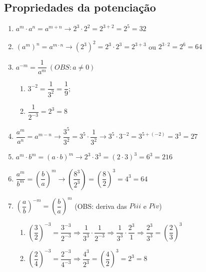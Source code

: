 \subsection{Propriedades da potenciação}
\begin{enumerate}[label=P\roman*)]
	\item $ a^{m} \cdot a^{n} = a^{m+n} \longrightarrow 2^{3} \cdot 2^{2} = 2^{3+2} = 2^{5} = 32 $
	\item $ (a^{m})^{n} = a^{m\cdot n} \longrightarrow (2^{3})^{2} = 2^{3}\cdot 2^{3} = 2^{3+3} $ ou $ 2^{3\cdot 2} = 2^{6} = 64 $
	\item $ a^{-m} = \dfrac{1}{a^{m}}\ (OBS: a \neq 0)$
	\begin{enumerate}[label=\alph*)]
		\item $ 3^{-2} = \dfrac{1}{3^{2}} = \dfrac{1}{9}; $
		
		\item $\dfrac{1}{2^{-3}} = 2^{3} = 8 $ 
	\end{enumerate}
	\item $ \dfrac{a^{m}}{a^{n}} = a^{m-n} \longrightarrow \dfrac{3^{5}}{3^{2}} = 3^{5}\cdot \dfrac{1}{3^{2}} \longrightarrow 3^{5}\cdot 3^{-2} = 3^{5+(-2)} = 3^{3} = 27$
	\item $ a^{m}\cdot b^{m}= (a\cdot b)^{m} \longrightarrow 2^{3}\cdot 3^{3} = (2\cdot 3)^{3} = 6^{3} = 216 $
	\item $ \dfrac{a^{m}}{b^{m}} = (\dfrac{b}{a})^{m} \longrightarrow (\dfrac{8^{3}}{2^{3}}) = (\dfrac{8}{2})^{3} = 4^{3} = 64 $
	\item $ (\dfrac{a}{b})^{-m} = (\dfrac{b}{a})^{m} $ (OBS: deriva das $ Piii $ e $ Piv $)
	\begin{enumerate}[label=\alph*)]
		\item $ (\dfrac{3}{2})^{-3} = \dfrac{3^{-3}}{2^{-3}} \Longrightarrow \dfrac{1}{3^{3}}\cdot \dfrac{1}{2^{-3}} \Longrightarrow \dfrac{1}{3^{3}}\cdot \dfrac{2^{3}}{1} \Longrightarrow \dfrac{2^{3}}{3^{3}} = (\dfrac{2}{3})^{3} $
		
		\item $ (\dfrac{2}{4})^{-3} = \dfrac{2^{-3}}{4^{-3}} \Longrightarrow \dfrac{4^{3}}{2^{3}} = (\dfrac{4}{2})^{3}  = 2^{3} = 8 $
	\end{enumerate}
\end{enumerate}

